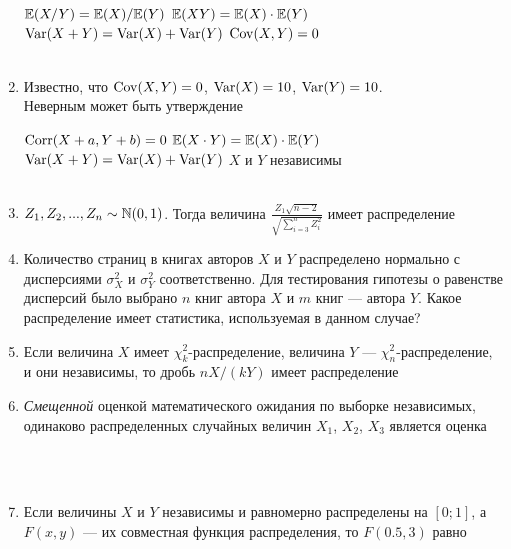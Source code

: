 \documentclass[12pt, a4paper]{article}\usepackage[]{graphicx}\usepackage[]{color}
\begin{document}
\begin{enumerate}
{$\mathbb{E}(X/Y)=\mathbb{E}(X)/\mathbb{E}(Y)$}
{$\mathbb{E}(XY)=\mathbb{E}(X)\cdot\mathbb{E}(Y)$}
{$\operatorname{Var}(X+Y)=\operatorname{Var}(X)+\operatorname{Var}(Y)$}
{$\operatorname{Cov}(X,Y)=0$} \\ \\

\item Известно, что  $\operatorname{Cov}(X,Y)=0$, $\operatorname{Var}(X)=10$, $\operatorname{Var}(Y)=10$. \\
Неверным может быть утверждение

{$\operatorname{Corr}(X+a,Y+b)=0$}
{$\mathbb{E}(X\cdot Y)=\mathbb{E}(X)\cdot \mathbb{E}(Y)$}
{$\operatorname{Var}(X+Y)=\operatorname{Var}(X)+\operatorname{Var}(Y)$}
{$X$ и $Y$ независимы} \\ \\

\item $Z_1,Z_2,...,Z_n\sim\mathbb N(0,1)$. Тогда величина $\frac{Z_1\sqrt{n-2}}{\sqrt{\sum_{i=3}^n Z_i^2}}$ имеет распределение


\item Количество страниц в книгах авторов $X$ и $Y$ распределено нормально с дисперсиями $\sigma^2_X$ и $\sigma^2_Y$ соответственно. Для тестирования гипотезы о равенстве дисперсий было выбрано $n$ книг автора $X$ и $m$ книг — автора $Y$. Какое распределение имеет статистика, используемая в данном случае?


\item Если величина $X$ имеет $\chi^2_k$-распределение, величина $Y$ — $\chi^2_n$-распределение, и они независимы, то дробь $nX/(kY)$ имеет распределение


\item \emph{Смещенной} оценкой математического ожидания по выборке независимых, одинаково распределенных случайных величин $X_1$, $X_2$, $X_3$ является оценка

 \\ \\

\item Если величины $X$ и $Y$ независимы и равномерно распределены на $[0;1]$, а $F(x,y)$ — их совместная функция  распределения, то $F(0.5,3)$ равно


\end{enumerate}
\end{document}

